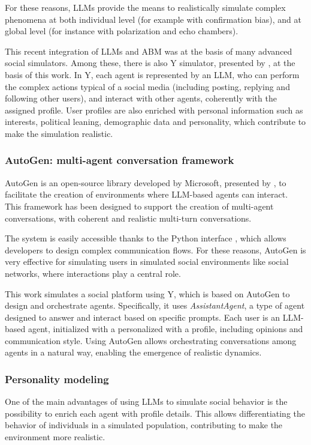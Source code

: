 For these reasons, LLMs provide the means to realistically simulate complex phenomena at both individual level (for example with confirmation bias), and at global level (for instance with polarization and echo chambers).

\medskip
This recent integration of LLMs and ABM was at the basis of many advanced social simulators.
Among these, there is also Y simulator, presented by \citet{rossetti2024ysocialllmpoweredsocial}, at the basis of this work.
In Y, each agent is represented by an LLM, who can perform the complex actions typical of a social media (including posting, replying and following other users), and interact with other agents, coherently with the assigned profile.
User profiles are also enriched with personal information such as interests, political leaning, demographic data and personality, which contribute to make the simulation realistic.


\subsubsection{AutoGen: multi-agent conversation framework}
AutoGen is an open-source library developed by Microsoft, presented by \citet{wu2023autogenenablingnextgenllm}, to facilitate the creation of environments where LLM-based agents can interact.
This framework has been designed to support the creation of multi-agent conversations, with coherent and realistic multi-turn conversations. 

\medskip
The system is easily accessible thanks to the Python interface \cite{pyautogen0.2.31}, which allows developers to design complex communication flows.
For these reasons, AutoGen is very effective for simulating users in simulated social environments like social networks, where interactions play a central role.

\medskip
This work simulates a social platform using Y\cite{rossetti2024ysocialllmpoweredsocial}, which is based on AutoGen to design and orchestrate agents.
Specifically, it uses \textit{AssistantAgent}, a type of agent designed to answer and interact based on specific prompts.
Each user is an LLM-based agent, initialized with a personalized with a profile, including opinions and communication style.
Using AutoGen allows orchestrating conversations among agents in a natural way, enabling the emergence of realistic dynamics.


\subsubsection{Personality modeling}
One of the main advantages of using LLMs to simulate social behavior is the possibility to enrich each agent with profile details.
This allows differentiating the behavior of individuals in a simulated population, contributing to make the environment more realistic.

